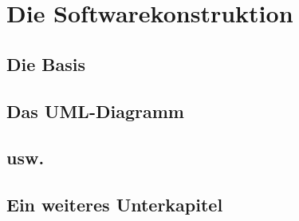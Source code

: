 \chapter{Die Softwarekonstruktion}
\label{chapter:kap2}
\section{Die Basis}
\section{Das UML-Diagramm}
\section{usw.}
\section{Ein weiteres Unterkapitel}